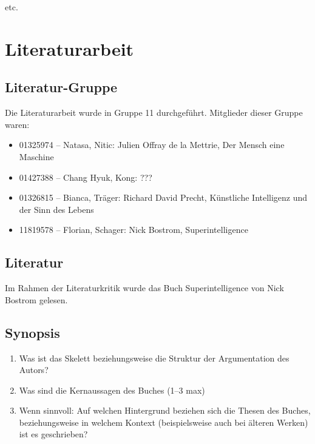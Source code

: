 \documentclass[twoside, a4paper, DIV=11, open=any, bibliography=totoc]{scrbook}
\begin{document}
etc.

\chapter{Literaturarbeit} \label{chp:LitKrit}

\section{Literatur-Gruppe} \label{sec:litgruppe}

Die Literaturarbeit wurde in Gruppe 11 durchgeführt. Mitglieder dieser Gruppe waren:

\begin{itemize}
    \item 01325974 – Natasa, Nitic: Julien Offray de la Mettrie, Der Mensch eine Maschine
    \item 01427388 – Chang Hyuk, Kong: ???
    \item 01326815 – Bianca, Träger: Richard David Precht, Künstliche Intelligenz und der Sinn des Lebens
    \item 11819578 – Florian, Schager: Nick Bostrom, Superintelligence
\end{itemize}


\section{Literatur} \label{sec:litlit}

Im Rahmen der Literaturkritik wurde das Buch Superintelligence von Nick Bostrom gelesen.

\section{Synopsis} \label{sec:litsynops}

\begin{enumerate}
    \item Was ist das Skelett beziehungsweise die Struktur der Argumentation des Autors?
    \item Was sind die Kernaussagen des Buches (1--3 max)
    \item Wenn sinnvoll: Auf welchen Hintergrund beziehen sich die Thesen des Buches, beziehungsweise in welchem Kontext (beispielsweise auch bei älteren Werken) ist es geschrieben?
\end{enumerate}
\end{document}
